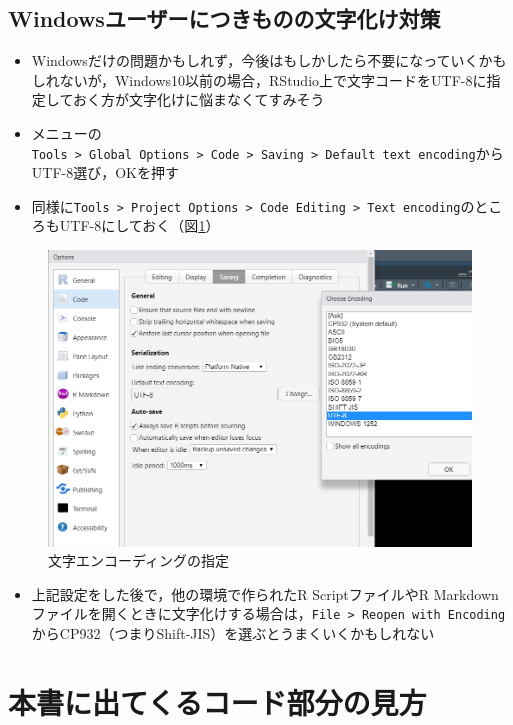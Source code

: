 \documentclass[
  xelatex,ja=standard, b5paper]{bxjsbook}
\providecommand{\tightlist}{%
  \setlength{\itemsep}{0pt}\setlength{\parskip}{0pt}}
\begin{document}
\hypertarget{p-utf8}{%
\subsection{Windowsユーザーにつきものの文字化け対策}\label{p-utf8}}

\begin{itemize}
\tightlist
\item
  Windowsだけの問題かもしれず，今後はもしかしたら不要になっていくかもしれないが，Windows10以前の場合，RStudio上で文字コードをUTF-8に指定しておく方が文字化けに悩まなくてすみそう
\item
  メニューの\texttt{Tools\ \textgreater{}\ Global\ Options\ \textgreater{}\ Code\ \textgreater{}\ Saving\ \textgreater{}\ Default\ text\ encoding}からUTF-8選び，OKを押す
\item
  同様に\texttt{Tools\ \textgreater{}\ Project\ Options\ \textgreater{}\ Code\ Editing\ \textgreater{}\ Text\ encoding}のところもUTF-8にしておく（図\ref{fig:utf8}）
\end{itemize}

\begin{figure}

{\centering \includegraphics[width=0.7\linewidth]{images/utf8} 

}

\caption{文字エンコーディングの指定}\label{fig:utf8}
\end{figure}

\begin{itemize}
\tightlist
\item
  上記設定をした後で，他の環境で作られたR ScriptファイルやR Markdownファイルを開くときに文字化けする場合は，\texttt{File\ \textgreater{}\ Reopen\ with\ Encoding}からCP932（つまりShift-JIS）を選ぶとうまくいくかもしれない
\end{itemize}

\hypertarget{p-howtoread}{%
\section{本書に出てくるコード部分の見方}\label{p-howtoread}}
\end{document}
